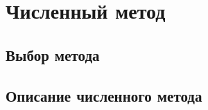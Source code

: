 \chapter{Численный метод}\label{ch:numeric}

\section*{Выбор метода}

\section*{Описание численного метода}
